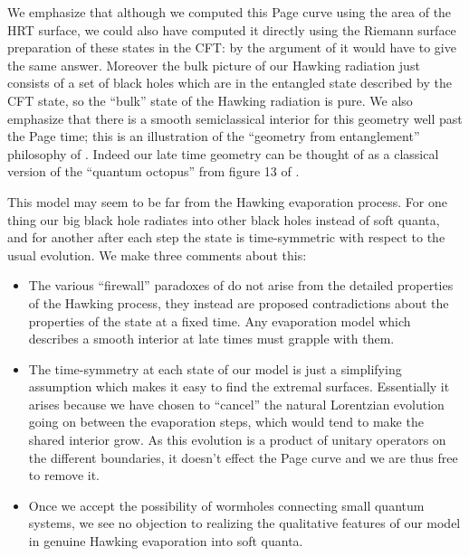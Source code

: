 \documentclass[12pt]{article}
\newcommand{\bi}{\begin{itemize}}
\newcommand{\ei}{\end{itemize}}
\theoremstyle{definition}
\begin{document}
We emphasize that although we computed this Page curve using the area of the HRT surface, we could also have computed it directly using the Riemann surface preparation of these states in the CFT: by the argument of \cite{Lewkowycz:2013nqa} it would have to give the same answer.  Moreover the bulk picture of our Hawking radiation just consists of a set of black holes which are in the entangled state described by the CFT state, so the ``bulk'' state of the Hawking radiation is pure.  We also emphasize that there is a smooth semiclassical interior for this geometry well past the Page time; this is an illustration of the ``geometry from entanglement'' philosophy of \cite{VanRaamsdonk:2010pw,VanRaamsdonk:2013sza,Maldacena:2013xja}.  Indeed our late time geometry can be thought of as a classical version of the ``quantum octopus'' from figure 13 of \cite{Maldacena:2013xja}.

This model may seem to be far from the Hawking evaporation process.  For one thing our big black hole radiates into other black holes instead of soft quanta, and for another after each step the state is time-symmetric with respect to the usual evolution.  We make three comments about this:
\bi
\item The various ``firewall'' paradoxes of \cite{Mathur:2009hf,Almheiri:2012rt,Almheiri:2013hfa,Marolf:2013dba} do not arise from the detailed properties of the Hawking process, they instead are proposed contradictions about the properties of the state at a fixed time.  Any evaporation model which describes a smooth interior at late times must grapple with them.  
\item The time-symmetry at each state of our model is just a simplifying assumption which makes it easy to find the extremal surfaces.  Essentially it arises because we have chosen to ``cancel'' the natural Lorentzian evolution going on between the evaporation steps, which would tend to make the shared interior grow.  As this evolution is a product of unitary operators on the different boundaries, it doesn't effect the Page curve and we are thus free to remove it. 
\item Once we accept the possibility of wormholes connecting small quantum systems, we see no objection to realizing the qualitative features of our model in genuine Hawking evaporation into soft quanta.
\ei
\end{document}
